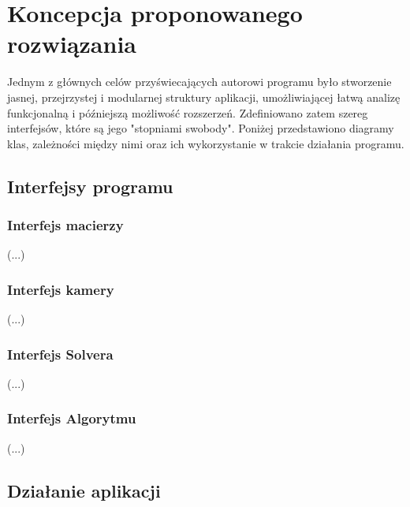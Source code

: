 \section{Koncepcja proponowanego rozwiązania}
Jednym z głównych celów przyświecających autorowi programu było stworzenie jasnej, przejrzystej i modularnej struktury aplikacji, umożliwiającej łatwą analizę funkcjonalną i późniejszą możliwość rozszerzeń. Zdefiniowano zatem szereg interfejsów, które są jego "stopniami swobody". Poniżej przedstawiono diagramy klas, zależności między nimi oraz ich wykorzystanie w trakcie działania programu.
\subsection{Interfejsy programu}
\subsubsection{Interfejs macierzy}
(...)
\subsubsection{Interfejs kamery}
(...)
\subsubsection{Interfejs Solvera}
(...)
\subsubsection{Interfejs Algorytmu}
(...)
\subsection{Działanie aplikacji}

